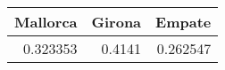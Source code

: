 \begin{tabular}{rrr}
\hline
   Mallorca &   Girona &   Empate \\
\hline
   0.323353 &   0.4141 & 0.262547 \\
\hline
\end{tabular}